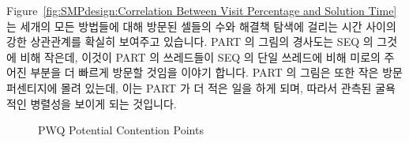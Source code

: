 Figure~\ref{fig:SMPdesign:Correlation Between Visit Percentage and Solution Time}
는 세개의 모든 방법들에 대해 방문된 셀들의 수와 해결책 탐색에 걸리는 시간
사이의 강한 상관관계를 확실히 보여주고 있습니다.
PART 의 그림의 경사도는 SEQ 의 그것에 비해 작은데, 이것이 PART 의 쓰레드들이
SEQ 의 단일 쓰레드에 비해 미로의 주어진 부분을 더 빠르게 방문할 것임을 이야기
합니다.
PART 의 그림은 또한 작은 방문 퍼센티지에 몰려 있는데, 이는 PART 가 더 적은 일을
하게 되며, 따라서 관측된 굴욕적인 병렬성을 보이게 되는 것입니다.

\begin{figure}[tb]
\begin{center}
\end{center}
\caption{PWQ Potential Contention Points}
\label{fig:SMPdesign:PWQ Potential Contention Points}
\end{figure}

